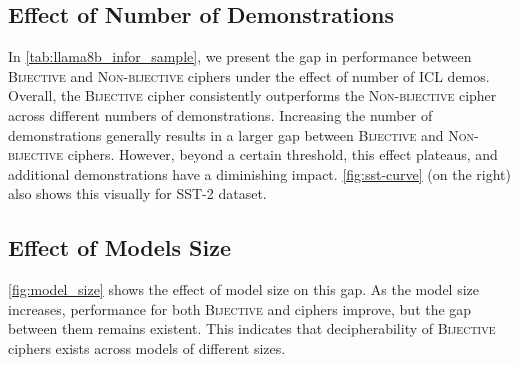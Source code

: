 \documentclass[11pt]{article}
\begin{document}
\subsection{Effect of Number of Demonstrations}
In \autoref{tab:llama8b_infor_sample}, we present the gap in performance between \textsc{Bijective} and \textsc{Non-bijective} ciphers under the effect of number of ICL demos.
Overall, the \textsc{Bijective} cipher consistently outperforms the \textsc{Non-bijective} cipher across different numbers of demonstrations.
Increasing the number of demonstrations generally results in a larger gap between \textsc{Bijective} and \textsc{Non-bijective} ciphers. However, beyond a certain threshold, this effect plateaus, and additional demonstrations have a diminishing impact.
\autoref{fig:sst-curve} (on the right) also shows this visually for SST-2 dataset.


\subsection{Effect of Models Size}
\autoref{fig:model_size} shows the effect of model size on this gap.
As the model size increases, performance for both \textsc{Bijective} and  ciphers improve, but the gap between them remains existent.
This indicates that decipherability of \textsc{Bijective} ciphers exists across models of different sizes.
\end{document}
